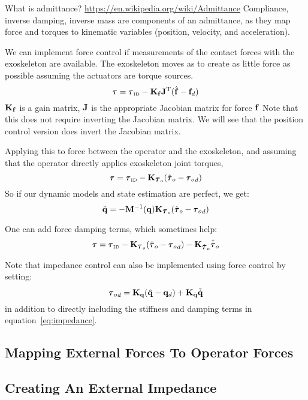 \documentclass[letterpaper,12pt,fullpage]{article}
\newcommand{\invdyn}{{\mbox {\tiny ID}}}
\begin{document}
What is admittance?
\url{https://en.wikipedia.org/wiki/Admittance}
Compliance, inverse damping, inverse mass are components of an admittance,
as they map force and torques to kinematic variables (position, velocity, and
acceleration). 

We can implement force control 
if measurements of the contact forces with
the exoskeleton are available.
The exoskeleton moves as to create as little force as possible 
assuming the actuators are torque sources.
\begin{equation}
\vtau = \vtau_{\invdyn} - \mK_{\vf} \mJ^{\tr} ( \hat{\vf} - \vf_d )
\end{equation}
${\bf K}_{{\bf f}}$ is a gain matrix, ${\bf J}$ is the appropriate Jacobian matrix for
force ${\bf f}$
Note that this does not require inverting the Jacobian matrix.
We will see that the position control version does invert the Jacobian matrix.

Applying this to force between the operator and the exoskeleton, and assuming
that the operator directly applies exoskeleton joint torques,
\begin{equation}
\vtau = \vtau_{\invdyn} - \mK_{\vtau_o} ( \hat{\vtau}_o - {\vtau_o}_d )
\end{equation}
So if our dynamic models and state estimation are perfect, we get:
\begin{equation}
\ddot{\vq} = - \mM^{-1} (\vq) \mK_{\vtau_o} ( \hat{\vtau}_o - {\vtau_o}_d )
\end{equation}

One can add force damping terms, which sometimes help:
\begin{equation}
\vtau = \vtau_{\invdyn} - \mK_{\vtau_o} ( \hat{\vtau}_o - {\vtau_o}_d )
- \mK_{\dot{\vtau}_o} \hat{\dot{\vtau}}_o
\end{equation}

Note that impedance control can also be implemented using force control
by setting:
\begin{equation}
{\vtau_o}_d = \mK_{\vq}( \hat{\vq} - \vq_d ) + \mK_{\dot{\vq}} \hat{\dot{\vq}}
\end{equation}
in addition to directly including the stiffness and damping terms in
equation~\ref{eq:impedance}. 

\subsection{Mapping External Forces To Operator Forces}

\subsection{Creating An External Impedance}
\end{document}
